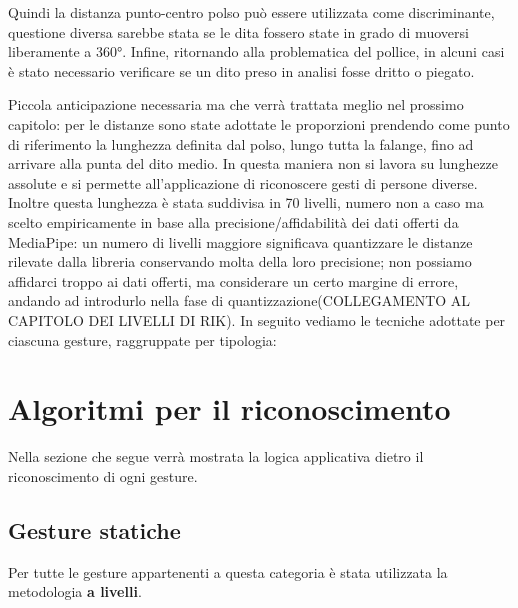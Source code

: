 \begin{multicols}{2}
\begin{multicolfigure}
    \end{multicolfigure} 
\end{multicols}
\vspace{+ 15 px}

\noindent Quindi la distanza punto-centro polso può essere utilizzata come discriminante, questione diversa sarebbe stata se le dita fossero state in grado di muoversi liberamente a 360°. Infine, ritornando alla problematica del pollice, in alcuni casi è stato necessario verificare se un dito preso in analisi fosse dritto o piegato.\\
\newpage

\noindent Piccola anticipazione necessaria ma che verrà trattata meglio nel prossimo capitolo: per le distanze sono state adottate le proporzioni prendendo come punto di riferimento la lunghezza definita dal polso, lungo tutta la falange, fino ad arrivare alla punta del dito medio. In questa maniera non si lavora su lunghezze assolute e si permette all’applicazione di riconoscere gesti di persone diverse. Inoltre questa lunghezza è stata suddivisa in 70 livelli, numero non a caso ma scelto empiricamente in base alla precisione/affidabilità dei dati offerti da MediaPipe: un numero di livelli maggiore significava quantizzare le distanze rilevate dalla libreria conservando molta della loro precisione; non possiamo  affidarci troppo ai dati offerti, ma considerare un certo margine di errore, andando ad introdurlo nella fase di quantizzazione(COLLEGAMENTO AL CAPITOLO DEI LIVELLI DI RIK). In seguito vediamo le tecniche adottate per ciascuna gesture, raggruppate per tipologia:

\newpage
\section{Algoritmi per il riconoscimento}
Nella sezione che segue verrà mostrata la logica applicativa dietro il riconoscimento di ogni gesture.

\subsection{Gesture statiche}
Per tutte le gesture appartenenti a questa categoria è stata utilizzata la metodologia \textbf{a livelli}.

